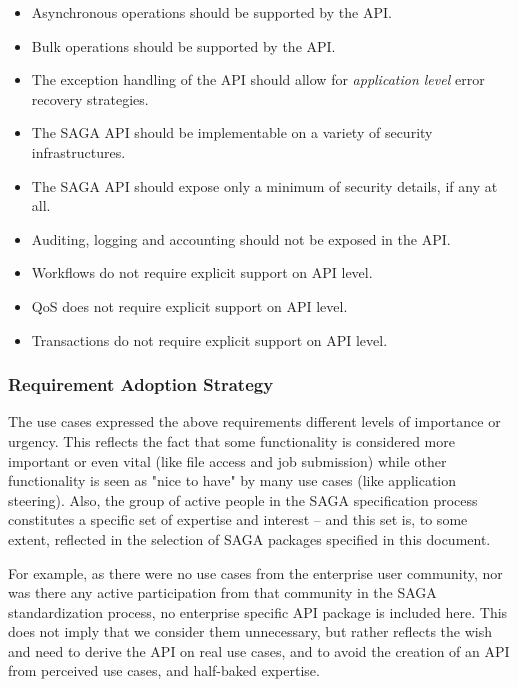   \begin{itemize}

   \item{Asynchronous operations should be supported by the API.}

   \item{Bulk operations should be supported by the API.}

   \item{The exception handling of the API should allow
         for \emph{application level} error recovery strategies.}

   \item{The SAGA API should be implementable on a variety of security
         infrastructures.}

   \item{The SAGA API should expose only a minimum of security details,
         if any at all.}

   \item{Auditing, logging and accounting should not be exposed in the
         API.}

   \item{Workflows do not require explicit support on API level.}

   \item{QoS does not require explicit support on API level.}

   \item{Transactions do not require explicit support on API level.}

  \end{itemize}


 \subsubsection{Requirement Adoption Strategy}
 
 The use cases expressed the above requirements 
 different levels of importance or urgency. This reflects the fact
 that some functionality is considered more important or even vital
 (like file access and job submission) while other functionality is
 seen as "nice to have" by many use cases (like application steering).
 Also, the group of active people in the SAGA specification process
 constitutes a specific set of expertise and interest -- and this set
 is, to some extent, reflected in the selection of SAGA packages
 specified in this document.
 
 For example, as there were no use cases from the enterprise user
 community, nor was there any active participation from that community
 in the SAGA standardization process, no enterprise specific API
 package is included here.  This does not imply that we consider them
 unnecessary, but rather reflects the wish and need to derive the API
 on real use cases, and to avoid the creation of an API from perceived
 use cases, and  half-baked expertise.

